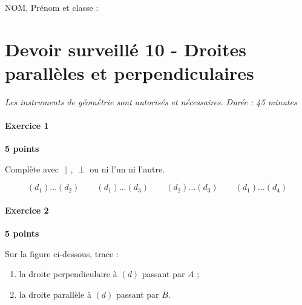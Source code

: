 \documentclass[a4paper,10pt]{report}
\begin{document}
\pagestyle{empty}
\noindent NOM, Prénom et classe : \dotfill

\section*{Devoir surveillé 10 - Droites parallèles et perpendiculaires}
\noindent\textit{Les instruments de géométrie sont autorisés et nécessaires.} \hfill \textit{Durée : 45 minutes}

\medskip
\paragraph{Exercice 1} \hfill \textbf{5 points}

\noindent Complète avec $\parallel$, $\perp$ ou ni l'un ni l'autre.

\begin{center}
\end{center}

\[
(d_1)\dots(d_2)\qquad (d_1)\dots(d_3)\qquad (d_2)\dots(d_3)\qquad (d_1)\dots(d_4)
\]

\medskip
\paragraph{Exercice 2} \hfill \textbf{5 points}

\noindent Sur la figure ci-dessous, trace :
\begin{enumerate}
\item la droite perpendiculaire à $(d)$ passant par $A$ ;
\item la droite parallèle à $(d)$ passant par $B$.
\end{enumerate}

\begin{center}
\end{center}
\end{document}
